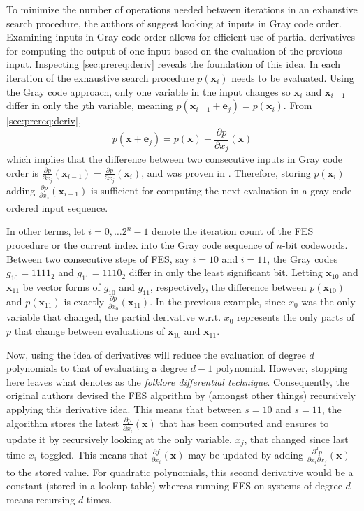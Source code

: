 To minimize the number of operations needed between iterations in an exhaustive search procedure, the authors of \cite{ches-2010-23990} suggest looking at inputs in Gray code order.
Examining inputs in Gray code order allows for efficient use of partial derivatives for computing the output of one input based on the evaluation of the previous input. Inspecting \cref{sec:prereq:deriv} reveals the foundation of this idea. In each iteration of the exhaustive search procedure $p(\mathbf{x}_i)$ needs to be evaluated. Using the Gray code approach, only one variable in the input changes so $\mathbf{x}_i$ and $\mathbf{x}_{i - 1}$ differ in only the $j$th variable, meaning $p(\mathbf{x}_{i - 1} + \mathbf{e}_j) = p(\mathbf{x}_i)$. From \cref{sec:prereq:deriv}, $$
    p(\mathbf{x} + \mathbf{e}_j) = p(\mathbf{x}) + \frac{\partial p}{\partial x_j}(\mathbf{x})
$$ 
which implies that the difference between two consecutive inputs in Gray code order is $\frac{\partial p}{\partial x_j}(\mathbf{x}_{i - 1}) = \frac{\partial p}{\partial x_j}(\mathbf{x}_i)$, and was proven in \cite{tungchoumasters}. Therefore, storing $p(\mathbf{x}_i)$ adding $\frac{\partial p}{\partial x_j}(\mathbf{x}_{i-1})$ is sufficient for computing the next evaluation in a gray-code ordered input sequence.

In other terms, let $i = 0,\dots 2^n-1$ denote the iteration count of the FES procedure or the current index into the Gray code sequence of $n$-bit codewords. Between two consecutive steps of FES, say $i = 10$ and $i = 11$, the Gray codes $g_{10} = 1111_2$ and $g_{11} = 1110_2$ differ in only the least significant bit. Letting $\mathbf{x}_{10}$ and $\mathbf{x}_{11}$ be vector forms of $g_{10}$ and $g_{11}$, respectively, the difference between $p(\mathbf{x}_{10})$ and $p(\mathbf{x}_{11})$ is exactly $\frac{\partial p}{\partial x_0}(\mathbf{x}_{11})$. In the previous example, since $x_0$ was the only variable that changed, the partial derivative w.r.t. $x_0$ represents the only parts of $p$ that change between evaluations of $\mathbf{x}_{10}$ and $\mathbf{x}_{11}$.

Now, using the idea of derivatives will reduce the evaluation of degree $d$ polynomials to that of evaluating a degree $d-1$ polynomial. However, stopping here leaves what \cite{ches-2010-23990} denotes as the \textit{folklore differential technique}. Consequently, the original authors devised the FES algorithm by (amongst other things) recursively applying this derivative idea. This means that between $s = 10$ and $s = 11$, the algorithm stores the latest $\frac{\partial p}{\partial x_i}(\mathbf{x})$ that has been computed and ensures to update it by recursively looking at the only variable, $x_j$, that changed since last time $x_i$ toggled. This means that $\frac{\partial f}{\partial x_i}(\mathbf{x})$ may be updated by adding $\frac{\partial^2 p}{\partial x_i \partial x_j}(\mathbf{x})$ to the stored value. For quadratic polynomials, this second derivative would be a constant (stored in a lookup table) whereas running FES on systems of degree $d$ means recursing $d$ times. 

